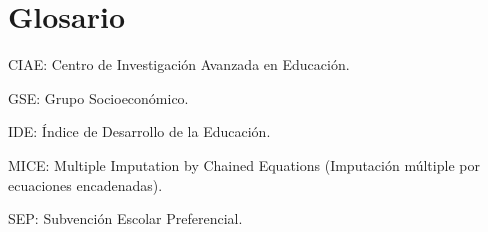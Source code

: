 \chapter*{Glosario}

CIAE: Centro de Investigación Avanzada en Educación.

GSE: Grupo Socioeconómico.

IDE: Índice de Desarrollo de la Educación.

MICE: Multiple Imputation by Chained Equations (Imputación múltiple por ecuaciones encadenadas).

SEP: Subvención Escolar Preferencial.